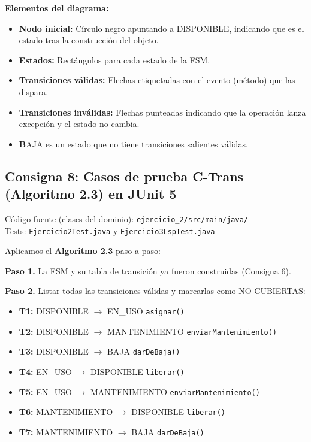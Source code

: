 \textbf{Elementos del diagrama:}
\begin{itemize}
    \item \textbf{Nodo inicial:} Círculo negro apuntando a DISPONIBLE, indicando que es el estado tras la construcción del objeto.
    \item \textbf{Estados:} Rectángulos para cada estado de la FSM.
    \item \textbf{Transiciones válidas:} Flechas etiquetadas con el evento (método) que las dispara.
    \item \textbf{Transiciones inválidas:} Flechas punteadas indicando que la operación lanza excepción y el estado no cambia.
    \item \textbf BAJA es un estado que no tiene transiciones salientes válidas.
\end{itemize}

\subsection{Consigna 8: Casos de prueba C-Trans (Algoritmo 2.3) en JUnit 5}

\noindent Código fuente (clases del dominio): \href{https://github.com/Cristopher-Ovaillos/Unidad_2_ValidacionVerificacion/tree/main/Unidad_2_code/ejercicio_2/src/main/java/com/example/}{\texttt{ejercicio\_2/src/main/java/}} \\
Tests: \href{https://github.com/Cristopher-Ovaillos/Unidad_2_ValidacionVerificacion/blob/main/Unidad_2_code/ejercicio_2/src/test/java/com/example/Ejercicio2Test.java}{\texttt{Ejercicio2Test.java}} y \href{https://github.com/Cristopher-Ovaillos/Unidad_2_ValidacionVerificacion/blob/main/Unidad_2_code/ejercicio_2/src/test/java/com/example/Ejercicio3LspTest.java}{\texttt{Ejercicio3LspTest.java}}

Aplicamos el \textbf{Algoritmo 2.3} paso a paso:

\textbf{Paso 1.} La FSM y su tabla de transición ya fueron construidas (Consigna 6).

\textbf{Paso 2.} Listar todas las transiciones válidas y marcarlas como NO CUBIERTAS:

\begin{itemize}
    \item \textbf{T1:} DISPONIBLE $\rightarrow$ EN\_USO \hfill \texttt{asignar()}
    \item \textbf{T2:} DISPONIBLE $\rightarrow$ MANTENIMIENTO \hfill \texttt{enviarMantenimiento()}
    \item \textbf{T3:} DISPONIBLE $\rightarrow$ BAJA \hfill \texttt{darDeBaja()}
    \item \textbf{T4:} EN\_USO $\rightarrow$ DISPONIBLE \hfill \texttt{liberar()}
    \item \textbf{T5:} EN\_USO $\rightarrow$ MANTENIMIENTO \hfill \texttt{enviarMantenimiento()}
    \item \textbf{T6:} MANTENIMIENTO $\rightarrow$ DISPONIBLE \hfill \texttt{liberar()}
    \item \textbf{T7:} MANTENIMIENTO $\rightarrow$ BAJA \hfill \texttt{darDeBaja()}
\end{itemize}

